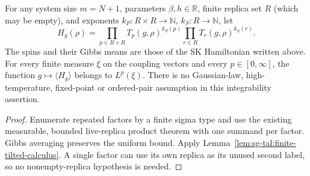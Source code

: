 \begin{lemma}
\label{lem:sg-tal:gibbs-moment-integrability}
\leanok
{}
For any system size $m=N+1$, parameters $\beta,h\in\mathbb R$, finite replica set $R$
(which may be empty), and exponents $k_P:R\times R\to\mathbb N$, $k_S:R\to\mathbb N$,
let
\[
 H_g(\rho)=\prod_{p\in R\times R}T_p(g,\rho)^{k_P(p)}
                  \prod_{r\in R}T_r(g,\rho)^{k_S(r)}.
\]
The spins and their Gibbs means are those of the SK Hamiltonian written above.
For every finite measure $\xi$ on the coupling vectors and every
$p\in[0,\infty]$, the function
$g\mapsto\langle H_g\rangle$ belongs to $L^p(\xi)$.
There is no Gaussian-law, high-temperature, fixed-point or ordered-pair assumption
in this integrability assertion.
\end{lemma}
\begin{proof}
\leanok
Enumerate repeated factors by a finite sigma type and use the existing measurable,
bounded live-replica product theorem with one summand per factor. Gibbs averaging
preserves the uniform bound. Apply Lemma~\ref{lem:sg-tal:finite-tilted-calculus}. A single factor
can use its own replica as its unused second label, so no nonempty-replica hypothesis
is needed.
\end{proof}

